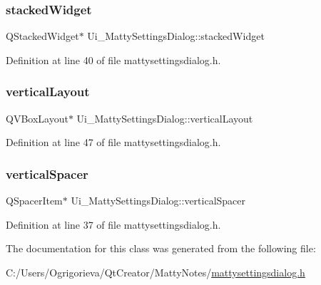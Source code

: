 \subsubsection{\texorpdfstring{stacked\+Widget}{stackedWidget}}
{\footnotesize\ttfamily Q\+Stacked\+Widget$\ast$ Ui\+\_\+\+Matty\+Settings\+Dialog\+::stacked\+Widget}



Definition at line 40 of file mattysettingsdialog.\+h.

\hypertarget{classUi__MattySettingsDialog_a48dce493aef2a264d0ad37d412414184}{}\label{classUi__MattySettingsDialog_a48dce493aef2a264d0ad37d412414184} 
\subsubsection{\texorpdfstring{vertical\+Layout}{verticalLayout}}
{\footnotesize\ttfamily Q\+V\+Box\+Layout$\ast$ Ui\+\_\+\+Matty\+Settings\+Dialog\+::vertical\+Layout}



Definition at line 47 of file mattysettingsdialog.\+h.

\hypertarget{classUi__MattySettingsDialog_a544c6542dc6561947512cfa9c6428cb4}{}\label{classUi__MattySettingsDialog_a544c6542dc6561947512cfa9c6428cb4} 
\subsubsection{\texorpdfstring{vertical\+Spacer}{verticalSpacer}}
{\footnotesize\ttfamily Q\+Spacer\+Item$\ast$ Ui\+\_\+\+Matty\+Settings\+Dialog\+::vertical\+Spacer}



Definition at line 37 of file mattysettingsdialog.\+h.



The documentation for this class was generated from the following file\+:\begin{DoxyCompactItemize}
\item 
C\+:/\+Users/\+Ogrigorieva/\+Qt\+Creator/\+Matty\+Notes/\hyperlink{mattysettingsdialog_8h}{mattysettingsdialog.\+h}\end{DoxyCompactItemize}
